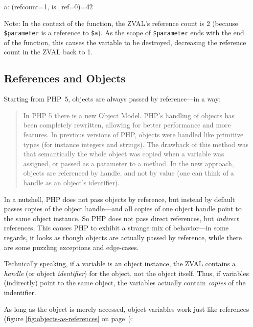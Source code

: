 \begin{textcode}
a: (refcount=1, is_ref=0)=42
\end{textcode}

Note: In the context of the function, the ZVAL's reference count is 2 (because \texttt{\$parameter} is a reference to \texttt{\$a}). As the scope of \texttt{\$parameter} ends with the end of the function, this causes the variable to be destroyed, decreasing the reference count in the ZVAL back to 1.


\subsection{References and Objects}
\label{object-references}

Starting from PHP~5, objects are always passed by reference---in a way:~\cite{php-manual-migration5-oop, php-src-rfc-object-handles}

\begin{quote}
In PHP 5 there is a new Object Model. PHP's handling of objects has been completely rewritten, allowing for better performance and more features. In previous versions of PHP, objects were handled like primitive types (for instance integers and strings). The drawback of this method was that semantically the whole object was copied when a variable was assigned, or passed as a parameter to a method. In the new approach, objects are referenced by handle, and not by value (one can think of a handle as an object's identifier).
\end{quote}

In a nutshell, PHP does not pass objects by reference, but instead by default passes copies of the object handle---and all copies of one object handle point to the same object instance. So PHP does not pass direct references, but \emph{indirect} references. This causes PHP to exhibit a strange mix of behavior---in some regards, it looks as though objects are actually passed by reference, while there are some puzzling exceptions and edge-cases.

Technically speaking, if a variable is an object instance, the ZVAL contains a \emph{handle} (or object \emph{identifier}) for the object, not the object itself. Thus, if variables (indirectly) point to the same object, the variables actually contain \emph{copies} of the indentifier.~\cite{php-manual-oop-references}

As long as the object is merely accessed, object variables work just like references (figure \ref{fig:objects-as-references} on page~\pageref{fig:objects-as-references}):

